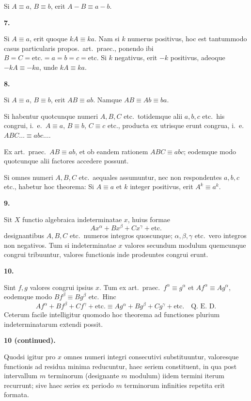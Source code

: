\documentclass[12pt,a4paper]{article}
\theoremstyle{plain}
\theoremstyle{definition}
\theoremstyle{remark}
\begin{document}
Si $A \equiv a$, $B \equiv b$, erit $A - B \equiv a - b$.

\textbf{7.}

Si $A \equiv a$, erit quoque $kA \equiv ka$. Nam si $k$ numerus positivus, hoc est tantummodo casus particularis propos.\ art.\ praec., ponendo ibi $B = C = \text{etc.} = a = b = c = \text{etc.}$ Si $k$ negativus, erit $-k$ positivus, adeoque $-kA \equiv -ka$, unde $kA \equiv ka$.

\textbf{8.}

Si $A \equiv a$, $B \equiv b$, erit $AB \equiv ab$. Namque $AB \equiv Ab \equiv ba$.

Si habentur quotcunque numeri $A, B, C$ etc.\ totidemque alii $a, b, c$ etc.\ his congrui, i.~e.\ $A \equiv a$, $B \equiv b$, $C \equiv c$ etc., producta ex utrisque erunt congrua, i.~e.\ $ABC \ldots \equiv abc \ldots$.

Ex art.\ praec.\ $AB \equiv ab$, et ob eandem rationem $ABC \equiv abc$; eodemque modo quotcunque alii factores accedere possunt.

Si omnes numeri $A, B, C$ etc.\ aequales assumuntur, nec non respondentes $a, b, c$ etc., habetur hoc theorema: Si $A \equiv a$ et $k$ integer positivus, erit $A^k \equiv a^k$.

\textbf{9.}

Sit $X$ functio algebraica indeterminatae $x$, huius formae
\[
Ax^\alpha + Bx^\beta + Cx^\gamma + \text{etc.}
\]
designantibus $A, B, C$ etc.\ numeros integros quoscunque; $\alpha, \beta, \gamma$ etc.\ vero integros non negativos. Tum si indeterminatae $x$ valores secundum modulum quemcunque congrui tribuuntur, valores functionis inde prodeuntes congrui erunt.

\textbf{10.}

Sint $f, g$ valores congrui ipsius $x$. Tum ex art.\ praec.\ $f^\alpha \equiv g^\alpha$ et $Af^\alpha \equiv Ag^\alpha$, eodemque modo $Bf^\beta \equiv Bg^\beta$ etc.\ Hinc
\[
Af^\alpha + Bf^\beta + Cf^\gamma + \text{etc.} \equiv Ag^\alpha + Bg^\beta + Cg^\gamma + \text{etc.} \quad \text{Q.~E.~D.}
\]
Ceterum facile intelligitur quomodo hoc theorema ad functiones plurium indeterminatarum extendi possit.

\textbf{10 \textnormal{(continued).}}

Quodsi igitur pro $x$ omnes numeri integri consecutivi substituuntur, valoresque functionis ad residua minima reducuntur, haec seriem constituent, in qua post intervallum $m$ terminorum (designante $m$ modulum) iidem termini iterum recurrunt; sive haec series ex periodo $m$ terminorum infinities repetita erit formata.
\end{document}
